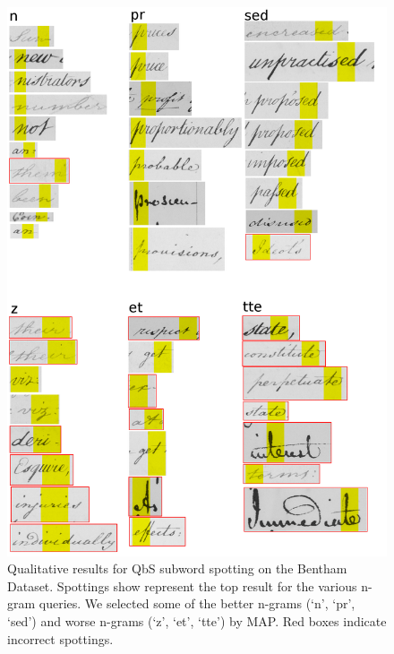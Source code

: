 \documentclass[ms,electronic,twosidetoc,letterpaper,chaptercenter,parttop,lol,lof,lot]{byumsphd}
\begin{document}
\begin{figure}
    \centering
    \includegraphics[width=.75\textwidth]{qualSpot}
    \caption{Qualitative results for QbS subword spotting on the Bentham Dataset. Spottings show represent the top result for the various n-gram queries. We selected some of the better n-grams (`n', `pr', `sed') and worse n-grams (`z', `et', `tte') by MAP. Red boxes indicate incorrect spottings.
    }
    \label{fig:qualSpot}
\end{figure}
\end{document}
